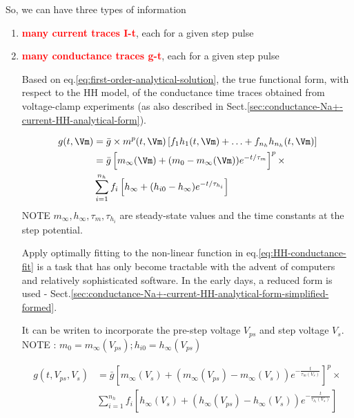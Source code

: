 So, we can have three types of information
\begin{enumerate}
  \item \textcolor{red}{\bf many current traces I-t}, each for a given step
  pulse

  \item \textcolor{red}{\bf many conductance traces g-t}, each for a given step
  pulse

Based on eq.\ref{eq:first-order-analytical-solution}, the true functional form,
with respect to the HH model, of the conductance time traces obtained from
voltage-clamp experiments (as also described in
Sect.\ref{sec:conductance-Na+-current-HH-analytical-form}).

\begin{equation}
\begin{split}
g(t, \Vm) &= \bar{g} \times m^p(t, \Vm) \left[ f_1 h_1(t,\Vm) + \ldots + f_{n_h}
h_{n_h}(t,\Vm) \right] \\
 &= \bar{g} \left[ m_\infty(\Vm) + (m_0 - m_\infty(\Vm)) e^{-t/\tau_m} \right]^p
 \times \\
 & \sum_{i=1}^{n_h}  f_i \left[ h_\infty + (h_{i0} - h_{\infty})
 e^{-t/\tau_{h_i}} \right]
\end{split}
\end{equation}
NOTE $m_\infty, h_\infty, \tau_m, \tau_{h_i}$ are steady-state values and the
time constants at the step potential.

\begin{mdframed}
Apply optimally fitting to the non-linear function in
eq.\ref{eq:HH-conductance-fit} is a task that has only become tractable with the
advent of computers and relatively sophisticated software. In the early days, a
reduced form is used -
Sect.\ref{sec:conductance-Na+-current-HH-analytical-form-simplified-formed}.
\end{mdframed}

It can be writen to incorporate the pre-step voltage $V_{ps}$ and step voltage
$V_s$. NOTE : $m_0 = m_\infty(V_{ps}); h_{i0}=h_\infty(V_{ps})$

\begin{equation}
\label{eq:HH-conductance-fit}
\begin{split}
g(t, V_{ps}, V_s) &= \bar{g} \left[ m_\infty(V_s) + (m_\infty(V_{ps}) -
m_\infty(V_s)) e^{-\frac{t}{\tau_m(V_s)}} \right]^p
 \times \\
 &\sum_{i=1}^{n_h}  f_i \left[ h_\infty(V_s) + (h_\infty(V_{ps}) -
 h_{\infty}(V_s)) e^{-\frac{t}{\tau_{h_i}(V_s)}} \right]
\end{split}
\end{equation}


\end{enumerate}
